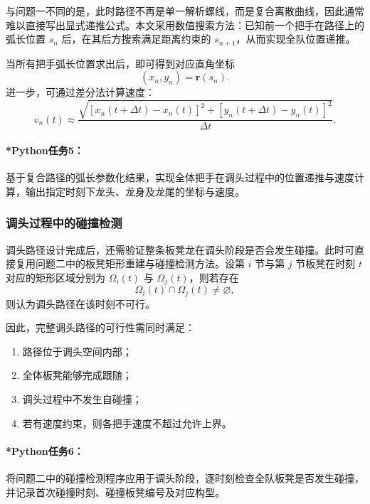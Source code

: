 \documentclass[12pt,a4paper]{ctexart}
\begin{document}
与问题一不同的是，此时路径不再是单一解析螺线，而是复合离散曲线，因此通常难以直接写出显式递推公式。本文采用数值搜索方法：已知前一个把手在路径上的弧长位置 $s_n$ 后，在其后方搜索满足距离约束的 $s_{n+1}$，从而实现全队位置递推。

当所有把手弧长位置求出后，即可得到对应直角坐标
\begin{equation}
(x_n,y_n)=\bm{r}(s_n).
\end{equation}
进一步，可通过差分法计算速度：
\begin{equation}
v_n(t)\approx
\frac{\sqrt{[x_n(t+\Delta t)-x_n(t)]^2+[y_n(t+\Delta t)-y_n(t)]^2}}{\Delta t}.
\end{equation}

\paragraph{*Python任务5：}
基于复合路径的弧长参数化结果，实现全体把手在调头过程中的位置递推与速度计算，输出指定时刻下龙头、龙身及龙尾的坐标与速度。

\subsubsection{调头过程中的碰撞检测}
调头路径设计完成后，还需验证整条板凳龙在调头阶段是否会发生碰撞。此时可直接复用问题二中的板凳矩形重建与碰撞检测方法。设第 $i$ 节与第 $j$ 节板凳在时刻 $t$ 对应的矩形区域分别为 $\Omega_i(t)$ 与 $\Omega_j(t)$，则若存在
\begin{equation}
\Omega_i(t)\cap\Omega_j(t)\neq\varnothing,
\end{equation}
则认为调头路径在该时刻不可行。

因此，完整调头路径的可行性需同时满足：

\begin{enumerate}
    \item 路径位于调头空间内部；
    \item 全体板凳能够完成跟随；
    \item 调头过程中不发生自碰撞；
    \item 若有速度约束，则各把手速度不超过允许上界。
\end{enumerate}

\paragraph{*Python任务6：}
将问题二中的碰撞检测程序应用于调头阶段，逐时刻检查全队板凳是否发生碰撞，并记录首次碰撞时刻、碰撞板凳编号及对应构型。
\end{document}
